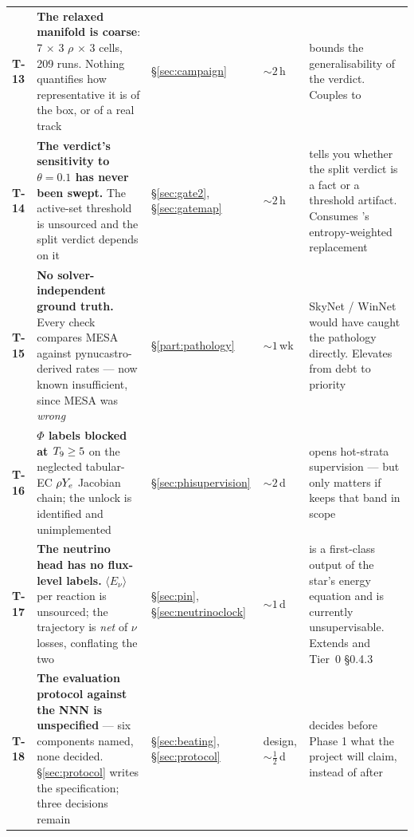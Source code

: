\begin{longtable}{@{}L{1.0cm} L{6.0cm} L{2.2cm} L{1.7cm} L{4.7cm}@{}}
\textbf{T-13} &
\textbf{The relaxed manifold is coarse}: 7 \Tn{} $\times$ 3 $\rho$ $\times$ 3
\Ye{} cells, 209 runs. Nothing quantifies how representative it is of the
box, or of a real track & \S\ref{sec:campaign} & ${\sim}2$\,h &
bounds the generalisability of the verdict. Couples to  \\

\textbf{T-14} &
\textbf{The verdict's sensitivity to $\theta = 0.1$ has never been swept.}
The active-set threshold is unsourced and the split verdict depends on it &
\S\ref{sec:gate2}, \S\ref{sec:gatemap} & ${\sim}2$\,h &
tells you whether the split verdict is a fact or a threshold artifact.
Consumes 's entropy-weighted replacement \\

\textbf{T-15} &
\textbf{No solver-independent ground truth.} Every check compares MESA
against pynucastro-derived rates --- now known insufficient, since MESA was
\emph{wrong} & \S\ref{part:pathology} & ${\sim}1$\,wk &
SkyNet \citep{lippuner2017} / WinNet \citep{reichert2023} would have caught
the pathology directly. Elevates  from debt to priority \\

\textbf{T-16} &
\textbf{$\Phi$ labels blocked at $T_{9} \ge 5$} on the neglected tabular-EC
$\rho Y_{e}$ Jacobian chain; the unlock is identified and unimplemented &
\S\ref{sec:phisupervision} & ${\sim}2$\,d &
opens hot-strata supervision --- but only matters if  keeps that
band in scope \\

\textbf{T-17} &
\textbf{The neutrino head has no flux-level labels.} $\langle E_\nu\rangle$
per reaction is unsourced; the trajectory  is \emph{net} of
$\nu$ losses, conflating the two &
\S\ref{sec:pin}, \S\ref{sec:neutrinoclock} & ${\sim}1$\,d &
\epsnu{} is a first-class output of the star's energy equation and is
currently unsupervisable. Extends  and Tier~0 \S 0.4.3 \\

\textbf{T-18} &
\textbf{The evaluation protocol against the NNN is unspecified} --- six
components named, none decided. \S\ref{sec:protocol} writes the
specification; three decisions remain &
\S\ref{sec:beating}, \S\ref{sec:protocol} & design, ${\sim}\tfrac12$\,d &
decides before Phase 1 what the project will claim, instead of after \\
\end{longtable}
\endgroup

